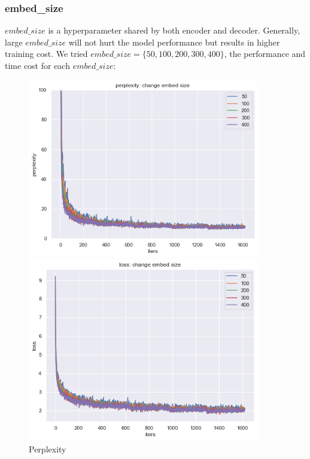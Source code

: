 \subsubsection{embed\_size}
$embed\_size$ is a hyperparameter shared by both encoder and decoder. Generally, large $embed\_size$ will not hurt the model performance but
results in higher training cost. We tried $embed\_size = \{50,100,200,300,400\}$, the performance and time cost for each $embed\_size$:\\
\begin{figure}[H]
    \centering 
    \begin{minipage}[b]{0.3\textwidth} 
    \centering 
    \includegraphics[width=0.9\textwidth]{p_embedsize.png}
    \caption{Perplexity} 
    \label{Fig.1}
    \end{minipage}
    \begin{minipage}[b]{0.3\textwidth}
    \centering 
    \includegraphics[width=0.9\textwidth]{l_embedsize.png}

\end{minipage}
\end{figure}
